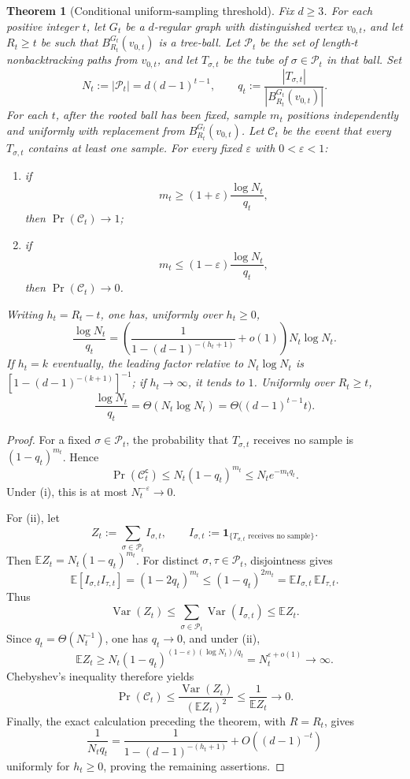 \documentclass[11pt]{amsart}
\newtheorem{theorem}{Theorem}[section]
\theoremstyle{definition}
\begin{document}
\begin{theorem}[Conditional uniform-sampling threshold]
\label{thm:sampling-threshold}
Fix $d\geq3$. For each positive integer $t$, let $G_t$ be a $d$-regular graph with distinguished vertex $v_{0,t}$, and let $R_t\geq t$ be such that $B_{R_t}^{G_t}(v_{0,t})$ is a tree-ball. Let $\mathcal P_t$ be the set of length-$t$ nonbacktracking paths from $v_{0,t}$, and let $T_{\sigma,t}$ be the tube of $\sigma\in\mathcal P_t$ in that ball. Set
\[
N_t:=|\mathcal P_t|=d(d-1)^{t-1},
\qquad
q_t:=\frac{|T_{\sigma,t}|}{|B_{R_t}^{G_t}(v_{0,t})|}.
\]
For each $t$, after the rooted ball has been fixed, sample $m_t$ positions independently and uniformly with replacement from $B_{R_t}^{G_t}(v_{0,t})$. Let $\mathcal C_t$ be the event that every $T_{\sigma,t}$ contains at least one sample. For every fixed $\varepsilon$ with $0<\varepsilon<1$:
\begin{enumerate}[label=(\roman*)]
\item if
\[
m_t\geq(1+\varepsilon)\frac{\log N_t}{q_t},
\]
then $\Pr(\mathcal C_t)\to1$;
\item if
\[
m_t\leq(1-\varepsilon)\frac{\log N_t}{q_t},
\]
then $\Pr(\mathcal C_t)\to0$.
\end{enumerate}
Writing $h_t=R_t-t$, one has, uniformly over $h_t\geq0$,
\[
\frac{\log N_t}{q_t}
=\left(\frac{1}{1-(d-1)^{-(h_t+1)}}+o(1)\right)N_t\log N_t.
\]
If $h_t=k$ eventually, the leading factor relative to $N_t\log N_t$ is $[1-(d-1)^{-(k+1)}]^{-1}$; if $h_t\to\infty$, it tends to $1$. Uniformly over $R_t\geq t$,
\[
\frac{\log N_t}{q_t}
=\Theta(N_t\log N_t)
=\Theta\bigl((d-1)^{t-1}t\bigr).
\]
\end{theorem}

\begin{proof}
For a fixed $\sigma\in\mathcal P_t$, the probability that $T_{\sigma,t}$ receives no sample is $(1-q_t)^{m_t}$. Hence
\[
\Pr(\mathcal C_t^{\mathsf c})
\leq N_t(1-q_t)^{m_t}
\leq N_te^{-m_tq_t}.
\]
Under (i), this is at most $N_t^{-\varepsilon}\to0$.

For (ii), let
\[
Z_t:=\sum_{\sigma\in\mathcal P_t}I_{\sigma,t},
\qquad
I_{\sigma,t}:=\mathbf 1_{\{T_{\sigma,t}\text{ receives no sample}\}}.
\]
Then $\mathbb E Z_t=N_t(1-q_t)^{m_t}$. For distinct $\sigma,\tau\in\mathcal P_t$, disjointness gives
\[
\mathbb E[I_{\sigma,t}I_{\tau,t}]
=(1-2q_t)^{m_t}
\leq(1-q_t)^{2m_t}
=\mathbb E I_{\sigma,t}\,\mathbb E I_{\tau,t}.
\]
Thus
\[
\operatorname{Var}(Z_t)
\leq\sum_{\sigma\in\mathcal P_t}\operatorname{Var}(I_{\sigma,t})
\leq\mathbb E Z_t.
\]
Since $q_t=\Theta(N_t^{-1})$, one has $q_t\to0$, and under (ii),
\[
\mathbb E Z_t
\geq N_t(1-q_t)^{(1-\varepsilon)(\log N_t)/q_t}
=N_t^{\varepsilon+o(1)}\longrightarrow\infty.
\]
Chebyshev's inequality therefore yields
\[
\Pr(\mathcal C_t)
\leq\frac{\operatorname{Var}(Z_t)}{(\mathbb E Z_t)^2}
\leq\frac1{\mathbb E Z_t}
\longrightarrow0.
\]
Finally, the exact calculation preceding the theorem, with $R=R_t$, gives
\[
\frac1{N_tq_t}
=\frac1{1-(d-1)^{-(h_t+1)}}+O((d-1)^{-t})
\]
uniformly for $h_t\geq0$, proving the remaining assertions.
\end{proof}
\end{document}
